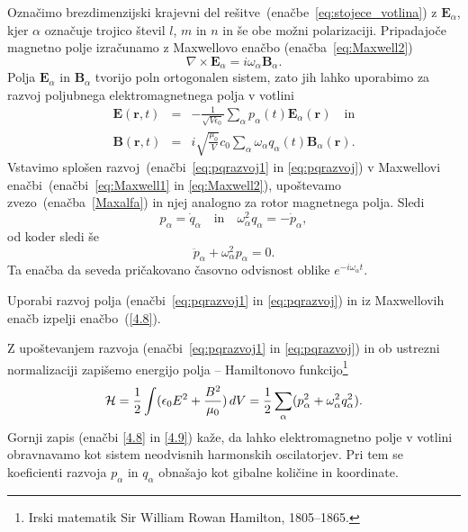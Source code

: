 Označimo brezdimenzijski krajevni del rešitve~(enačbe~\ref{eq:stojece_votlina}) z 
$\mathbf{E}_{\alpha}$, kjer $\alpha$
označuje trojico števil $l$, $m$ in $n$ in še obe možni polarizaciji. 
Pripadajoče magnetno polje izračunamo z Maxwellovo enačbo (enačba~\ref{eq:Maxwell2}) 
\begin{equation}
\nabla\times\mathbf{E}_{\alpha}=i\omega_\alpha\mathbf{B}_{\alpha}.
\label{Maxalfa}
\end{equation}
Polja $\mathbf{E}_{\alpha}$ in $\mathbf{B}_{\alpha}$ tvorijo poln ortogonalen
sistem, zato jih lahko uporabimo za razvoj poljubnega elektromagnetnega polja v votlini
\begin{eqnarray}
\mathbf{E}(\mathbf{r},t) & = & -\frac{1}{\sqrt{V\epsilon_{0}}}
\sum_{\alpha}p_{\alpha}(t)\mathbf{E}_{\alpha}(\mathbf{r}) \quad \mathrm{in} \label{eq:pqrazvoj1}\\
\mathbf{B}(\mathbf{r},t) & = & i\sqrt{\frac{\mu_{0}}{V}}c_0\sum_{\alpha}
\omega_{\alpha}q_{\alpha}(t)\mathbf{B}_{\alpha}(\mathbf{r}).
\label{eq:pqrazvoj}
\end{eqnarray}
Vstavimo splošen razvoj~(enačbi~\ref{eq:pqrazvoj1} in \ref{eq:pqrazvoj}) v 
Maxwellovi enačbi~(enačbi~\ref{eq:Maxwell1} in \ref{eq:Maxwell2}), upoštevamo zvezo~(enačba~\ref{Maxalfa}) in njej analogno za rotor magnetnega polja. Sledi
\begin{equation}
p_{\alpha}=\dot{q}_{\alpha} \quad \mathrm{in} \quad 
\omega_{\alpha}^{2}q_{\alpha}=-\dot{p}_{\alpha},
\label{4.7}
\end{equation}
od koder sledi še 
\begin{equation}
\ddot{p}_{\alpha}+\omega_{\alpha}^{2}p_{\alpha}=0.
\label{4.8}
\end{equation}
Ta enačba da seveda pričakovano časovno odvisnost oblike $e^{-i \omega_\alpha t}$.

\begin{definition}
 Uporabi razvoj polja (enačbi~\ref{eq:pqrazvoj1} in \ref{eq:pqrazvoj}) 
 in iz Maxwellovih enačb izpelji
 enačbo~(\ref{4.8}).
\end{definition}

Z upoštevanjem razvoja (enačbi~\ref{eq:pqrazvoj1} in \ref{eq:pqrazvoj}) in ob ustrezni
normalizaciji zapišemo energijo 
polja -- Hamiltonovo 
funkcijo\footnote{Irski matematik Sir William Rowan Hamilton, 1805--1865.}
\begin{equation}
{\cal H}=\frac{1}{2}\int(\epsilon_{0}E^{2}+\frac{B^{2}}{\mu_0})\, 
dV=\frac{1}{2}\sum_{\alpha}(p_{\alpha}^{2}+\omega_{\alpha}^{2}q_{\alpha}^{2}).
\label{4.9}
\end{equation}
Gornji zapis (enačbi \ref{4.8} in \ref{4.9}) kaže, 
da lahko elektromagnetno polje v votlini
obravnavamo kot sistem neodvisnih harmonskih oscilatorjev. 
Pri tem se koeficienti razvoja $p_{\alpha}$ in $q_{\alpha}$ obnašajo kot
gibalne količine in koordinate. 

